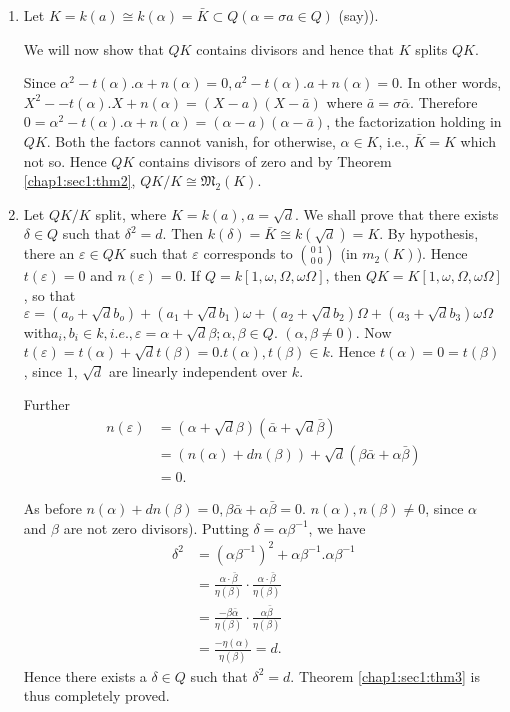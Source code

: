 \begin{enumerate}[1)]
\item Let $K = k (a) \cong k(\alpha) = \bar{K} \subset Q(\alpha =
  \sigma a \in Q) $ (say)). 

  We will now show that $QK$ contains divisors and hence that $K$ splits $QK$.
  
  Since $\alpha^2 -t(\alpha).  \alpha + n(\alpha) =0, a^2-t(\alpha).a+
  n(\alpha) =0$. In other words, $X^2 - -t(\alpha). X+n(\alpha) = (X-a)
  (X-\bar{a})$ where $\bar{a} = \sigma \bar{\alpha}$. Therefore $0=
  \alpha^2 -t(\alpha).  \alpha + n(\alpha) = (\alpha -a) (\alpha -
  \bar{a})$, the factorization holding in $QK$. Both the factors cannot
  vanish, for otherwise, $\alpha \in K$, i.e., $\bar{K}= K$ which not
  so. Hence $QK$ contains divisors of zero and by
  Theorem \ref{chap1:sec1:thm2}, $QK/ K
  \cong \mathfrak{M}_2(K)$. 
\item Let $QK/K$ split, where $K= k(a),  a = \sqrt{d}$. We shall prove
  that there exists $\delta \in Q$ such that $\delta^2 =d$. Then
  $k(\delta) = \bar{K} \cong k (\sqrt{d})=K$. By hypothesis, there an
  $\varepsilon \in Q K$ such that $\varepsilon$ corresponds to
  $ \binom{0~ 1}{0~ 0}$ (in $m_2 (K)$). Hence
  $t(\varepsilon)=0$ and $n(\varepsilon) = 0$. If $Q=k[1, \omega,
    \Omega,  \omega \Omega]$, then $Q K= K[1, \omega, \Omega,  \omega
    \Omega]$, so that $\varepsilon = (a_o + \sqrt{d} b_o) + (a_1 +
  \sqrt{d} b_1) \omega + (a_2 + \sqrt{d} b_2) \Omega + (a_3 + \sqrt{d}
  b_3) \omega \Omega$ with\pageoriginale $a_i,b_i \in k, i.e., \varepsilon = \alpha
  + \sqrt{d} \beta ; \alpha, \beta \in Q$.  $(\alpha, \beta \neq
  0)$. Now $t(\varepsilon) = t(\alpha) + \sqrt{d} t(\beta)
  =0. t(\alpha),   t(\beta) \in k$. Hence $t(\alpha)=0= t(\beta)$,
  since $1$, $\sqrt{d}$ are linearly independent over $k$.  
  
  Further
  \begin{align*}
    n(\varepsilon) & = \left(\alpha + \sqrt{d} \beta\right) \left(\bar{\alpha}+
    \sqrt{d} \bar{\beta}\right)\\ 
    &= (n (\alpha) + dn(\beta)) + \sqrt{d} \left(\beta \bar{\alpha} +
    \alpha \bar{\beta}\right)\\ 
    & = 0.
  \end{align*}

  As before $n(\alpha) + d n(\beta) = 0, \beta \bar{\alpha} + \alpha
  \bar{\beta} =0$. $n(\alpha), n(\beta) \neq 0$, since $\alpha$ and
  $\beta$ are not zero divisors). Putting $\delta = \alpha
  \beta^{-1}$, we have  
  \begin{align*}
    \delta^2 & = (\alpha \beta^{-1})^2 + \alpha \beta^{-1}. \alpha \beta^{-1}\\
    & = \frac{\alpha \cdot \bar{\beta}}{\eta (\beta)}\cdot
    \frac{\alpha \cdot \bar{\beta}}{\eta (\beta)}\\ 
    & = \frac{- \beta \bar{\alpha}}{\eta(\beta)}\cdot \frac{\alpha
      \bar{\beta}}{\eta(\beta)}\\ 
    & = \frac{-\eta(\alpha)}{\eta(\beta)} = d.
  \end{align*}
  Hence there exists a $\delta \in Q$ such that $\delta^2
  =d$. Theorem \ref{chap1:sec1:thm3} is thus completely proved. 
\end{enumerate}

